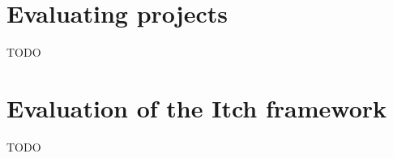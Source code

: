 \documentclass[../main]{subfiles}
\begin{document}
%
%
%
%
%
%

%
%
%

%
%
%
%
%
%


\section{Evaluating projects}\label{sec:itch-evaluating-projects}

TODO

\section{Evaluation of the Itch framework}\label{sec:itch-evaluation}

TODO
\end{document}
